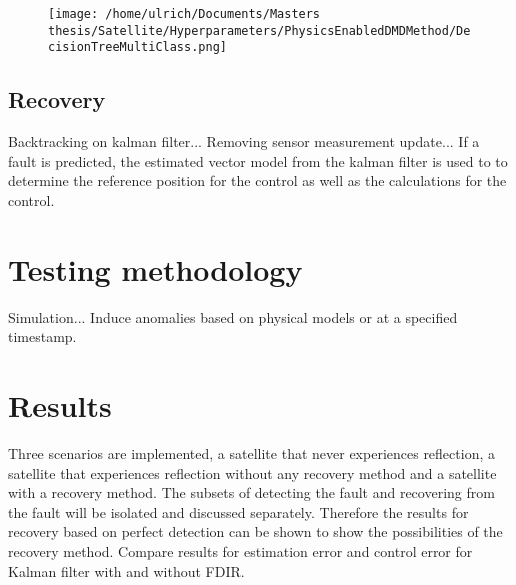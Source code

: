 \documentclass[letterpaper, 10 pt, conference]{ieeeconf}  %
\begin{document}
\begin{figure}[!htb]
\texttt{[image: /home/ulrich/Documents/Masters thesis/Satellite/Hyperparameters/PhysicsEnabledDMDMethod/DecisionTreeMultiClass.png]}
\end{figure}


\subsection{Recovery}
Backtracking on kalman filter... Removing sensor measurement update... If a fault is predicted, the estimated vector model from the kalman filter is used to to determine the reference position for the control as well as the calculations for the control.

\section{Testing methodology}
Simulation... Induce anomalies based on physical models or at a specified timestamp.

\section{Results}
Three scenarios are implemented, a satellite that never experiences reflection, a satellite that experiences reflection without any recovery method and a satellite with a recovery method. The subsets of detecting the fault and recovering from the fault will be isolated and discussed separately. Therefore the results for recovery based on perfect detection can be shown to show the possibilities of the recovery method.
Compare results for estimation error and control error for Kalman filter with and without FDIR.
\end{document}
